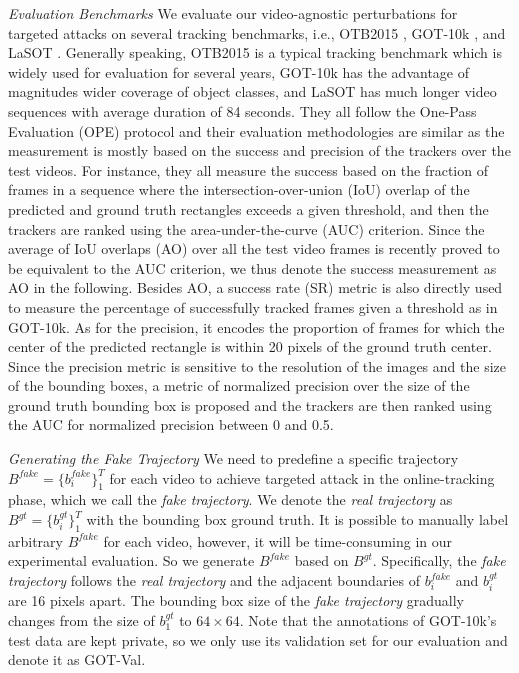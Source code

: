 \documentclass[journal]{IEEEtran}
\newcommand{\ie}{i.e.}
\begin{document}
\textit{Evaluation Benchmarks} We evaluate our video-agnostic perturbations for targeted attacks on several tracking benchmarks, \ie, OTB2015 \cite{OTB}, GOT-10k \cite{GOT-10k}, and LaSOT \cite{LaSOT}. Generally speaking, OTB2015 is a typical tracking benchmark which is widely used for evaluation for several years, GOT-10k has the advantage of magnitudes wider coverage of object classes, and LaSOT has much longer video sequences with average duration of 84 seconds. They all follow the One-Pass Evaluation (OPE) protocol and their evaluation methodologies are similar as the measurement is mostly based on the success and precision of the trackers over the test videos. For instance, they all measure the success based on the fraction of frames in a sequence where the intersection-over-union (IoU) overlap of the predicted and ground truth rectangles exceeds a given threshold, and then the trackers are ranked using the area-under-the-curve (AUC) criterion. Since the average of IoU overlaps (AO) over all the test video frames is recently proved to be equivalent to the AUC criterion, we thus denote the success measurement as AO in the following. Besides AO, a success rate (SR) metric is also directly used to measure the percentage of successfully tracked frames given a threshold as in GOT-10k. As for the precision, it encodes the proportion of frames for which the center of the predicted rectangle is within 20 pixels of the ground truth center. Since the precision metric is sensitive to the resolution of the images and the size of the bounding boxes, a metric of normalized precision over the size of the ground truth bounding box is proposed and the trackers are then ranked using the AUC for normalized precision between 0 and 0.5.

\textit{Generating the Fake Trajectory} We need to predefine a specific trajectory $B^{fake}=\{b^{fake}_i\}_1^{T}$ for each video to achieve targeted attack in the online-tracking phase, which we call the \textit{fake trajectory}. We denote the \textit{real trajectory} as $B^{gt}=\{b^{gt}_i\}_1^T$ with the bounding box ground truth.
It is possible to manually label arbitrary $B^{fake}$ for each video, however, it will be time-consuming in our experimental evaluation. So we generate $B^{fake}$ based on $B^{gt}$. Specifically, the \textit{fake trajectory} follows the \textit{real trajectory} and the adjacent boundaries of $b^{fake}_i$ and $b^{gt}_i$ are 16 pixels apart.
The bounding box size of the \textit{fake trajectory} gradually changes from the size of $b^{gt}_1$ to $64\times 64$. Note that the annotations of GOT-10k's test data are kept private, so we only use its validation set for our evaluation and denote it as GOT-Val.
\end{document}
